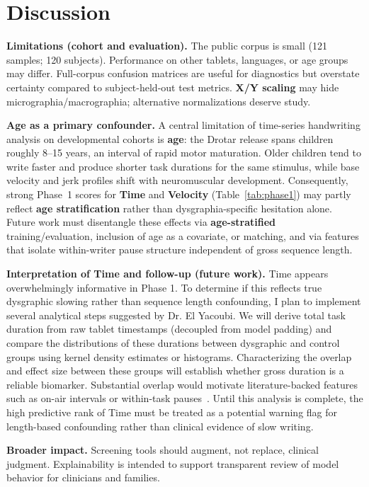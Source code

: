 \documentclass{article}
\begin{document}
\section{Discussion}
\label{sec:discussion}

\textbf{Limitations (cohort and evaluation).} The public corpus is small (121 samples; 120 subjects). Performance on other tablets, languages, or age groups may differ. Full-corpus confusion matrices are useful for diagnostics but overstate certainty compared to subject-held-out test metrics. \textbf{X/Y scaling} may hide micrographia/macrographia; alternative normalizations deserve study.

\textbf{Age as a primary confounder.} A central limitation of time-series handwriting analysis on developmental cohorts is \textbf{age}: the Drotar release spans children roughly 8--15 years, an interval of rapid motor maturation. Older children tend to write faster and produce shorter task durations for the same stimulus, while base velocity and jerk profiles shift with neuromuscular development. Consequently, strong Phase~1 scores for \textbf{Time} and \textbf{Velocity} (Table~\ref{tab:phase1}) may partly reflect \textbf{age stratification} rather than dysgraphia-specific hesitation alone. Future work must disentangle these effects via \textbf{age-stratified} training/evaluation, inclusion of age as a covariate, or matching, and via features that isolate within-writer pause structure independent of gross sequence length.

\textbf{Interpretation of Time and follow-up (future work).} 
Time appears overwhelmingly informative in Phase 1. To determine if this reflects true dysgraphic slowing rather than sequence length confounding, I plan to implement several analytical steps suggested by Dr. El Yacoubi. We will derive total task duration from raw tablet timestamps (decoupled from model padding) and compare the distributions of these durations between dysgraphic and control groups using kernel density estimates or histograms.  Characterizing the overlap and effect size between these groups will establish whether gross duration is a reliable biomarker. Substantial overlap would motivate literature-backed features such as on-air intervals or within-task pauses~\cite{kunhoth2022}. Until this analysis is complete, the high predictive rank of Time must be treated as a potential warning flag for length-based confounding rather than clinical evidence of slow writing.

\textbf{Broader impact.} Screening tools should augment, not replace, clinical judgment. Explainability is intended to support transparent review of model behavior for clinicians and families.
\end{document}
